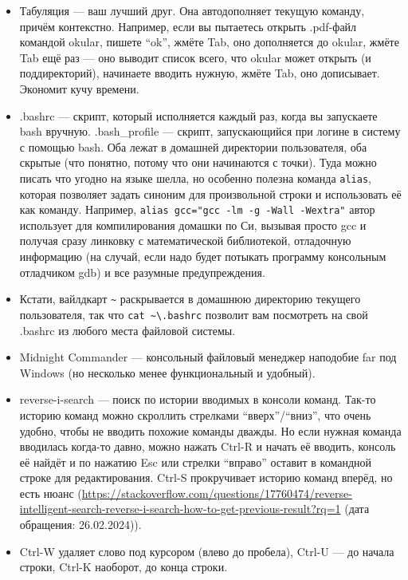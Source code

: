 \documentclass{../../text-style}
\begin{document}
\begin{itemize}
    \item Табуляция --- ваш лучший друг.
        Она автодополняет текущую команду, причём контекстно. 
        Например, если вы пытаетесь открыть .pdf-файл командой okular, пишете \enquote{ok}, жмёте Tab, оно дополняется до okular, жмёте Tab ещё раз --- оно выводит список всего, что okular может открыть (и поддиректорий), начинаете вводить нужную, жмёте Tab, оно дописывает.
        Экономит кучу времени.
    \item .bashrc --- скрипт, который исполняется каждый раз, когда вы запускаете bash вручную.
        .bash\_profile --- скрипт, запускающийся при логине в систему с помощью bash.
        Оба лежат в домашней директории пользователя, оба скрытые (что понятно, потому что они начинаются с точки).
        Туда можно писать что угодно на языке шелла, но особенно полезна команда \verb|alias|, которая позволяет задать синоним для произвольной строки и использовать её как команду.
        Например, \verb|alias gcc="gcc -lm -g -Wall -Wextra"| автор использует для компилирования домашки по Си, вызывая просто gcc и получая сразу линковку с математической библиотекой, отладочную информацию (на случай, если надо будет потыкать программу консольным отладчиком gdb) и все разумные предупреждения.
    \item Кстати, вайлдкарт \verb|~| раскрывается в домашнюю директорию текущего пользователя, так что \verb|cat ~\.bashrc| позволит вам посмотреть на свой .bashrc из любого места файловой системы.
    \item Midnight Commander --- консольный файловый менеджер наподобие far под Windows (но несколько менее функциональный и удобный).
    \item reverse-i-search --- поиск по истории вводимых в консоли команд.
        Так-то историю команд можно скроллить стрелками \enquote{вверх}/\enquote{вниз}, что очень удобно, чтобы не вводить похожие команды дважды.
        Но если нужная команда вводилась когда-то давно, можно нажать Ctrl-R и начать её вводить, консоль её найдёт и по нажатию Esc или стрелки \enquote{вправо} оставит в командной строке для редактирования.
        Ctrl-S прокручивает историю команд вперёд, но есть нюанс (\url{https://stackoverflow.com/questions/17760474/reverse-intelligent-search-reverse-i-search-how-to-get-previous-result?rq=1} (дата обращения: 26.02.2024)).
    \item Ctrl-W удаляет слово под курсором (влево до пробела), Ctrl-U --- до начала строки, Ctrl-K наоборот, до конца строки.

\end{itemize}
\end{document}
